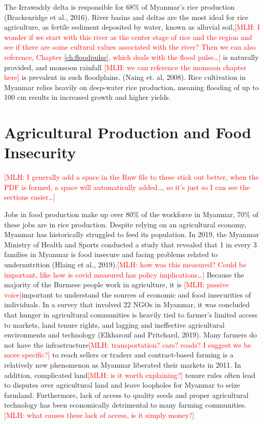 \documentclass{book}\usepackage{knitr}
\newcommand{\red}[1]{\textcolor{red}{[MLH: #1]}}
\begin{document}
{The Irrawaddy delta is responsible for 68\% of Myanmar’s rice production (Brackenridge et al., 2016). River basins and deltas are the most ideal for rice agriculture, as fertile sediment deposited by water, known as alluvial soil,\red{I wonder if we start with this river as the center stage of rice and the region and see if there are some cultural values associated with the river?  Then we can also reference, Chapter \ref{ch:floodpulse}, which deals with the flood pulse\ldots} is naturally provided, and monsoon rainfall \red{we can reference the monsoon chapter here} is prevalent in such floodplains. (Naing et. al, 2008). Rice cultivation in Myanmar relies heavily on deep-water rice production, meaning flooding of up to 100 cm results in increased growth and higher yields.
 
\section{Agricultural Production and Food Insecurity}\red{I generally add a space in the Rnw file to these stick out better, when the PDF is formed, a space will automatically added\ldots, so it's just so I can see the sections easier\ldots}

Jobs in food production make up over 80\% of the workforce in Myanmar, 70\% of these jobs are in rice production. Despite relying on an agricultural economy, Myanmar has historically struggled to feed its population. In 2019, the Myanmar Ministry of Health and Sports conducted a study that revealed that 1 in every 3 families in Myanmar is food insecure and facing problems related to undernutrition (Hlaing et al., 2019).\red{how was this measured?  Could be important, like how is covid measured has policy implications\ldots} Because the majority of the Burmese people work in agriculture, it is \red{passive voice}important to understand the sources of economic and food insecurities of individuals. In a survey that involved 22 NGOs in Myanmar, it was concluded that hunger in agricultural communities is heavily tied to farmer’s limited access to markets, land tenure rights, and lagging and ineffective agricultural environments and technology (Elkharouf and Pritchard, 2019). Many farmers do not have the infrastructure\red{transportation? cars? roads? I suggest we  be more specific?} to reach sellers or traders and contract-based farming is a relatively new phenomenon as Myanmar liberated their markets in 2011. In addition, complicated land\red{is it worth explaining?} tenure rules often lead to disputes over agricultural land and leave loopholes for Myanmar to seize farmland. Furthermore, lack of access to quality seeds and proper agricultural technology has been economically detrimental to many farming communities. \red{what causes these lack of access, is it simply money?}

}
\end{document}
